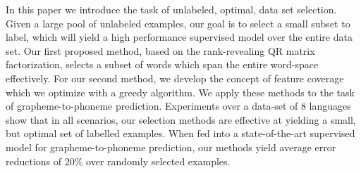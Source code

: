 In this paper we introduce the task of unlabeled, optimal, data set     selection. Given a large pool of unlabeled examples, our goal is to select
     a small subset to label, which will yield a high performance supervised
     model over the entire data set. Our first proposed method, based on the
     rank-revealing QR matrix factorization, selects a subset of words which
     span the entire word-space effectively.  For our second method, we develop
     the concept of feature coverage which we optimize with a greedy algorithm. 
 We
     apply these methods to the task of grapheme-to-phoneme prediction.
     Experiments over a data-set of 8 languages show that in all scenarios,
     our selection methods are effective at yielding a small, but
     optimal set of labelled examples.  When fed into a state-of-the-art
     supervised model for grapheme-to-phoneme prediction, our methods yield
     average error reductions of 20\% over randomly selected examples.

